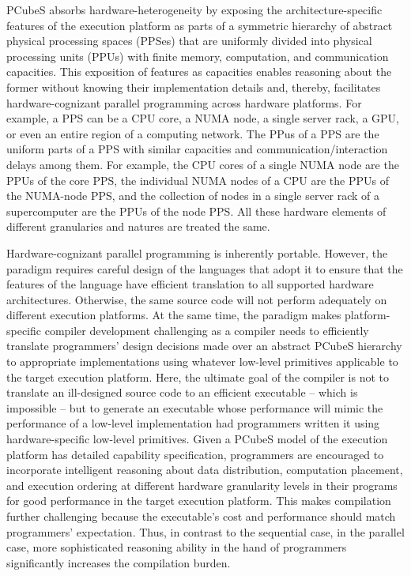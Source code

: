 \documentclass[ASNA,twocolumn]{USG} %
\begin{document}
{{PCubeS absorbs hardware-heterogeneity by exposing the architecture-specific features of the execution platform as parts of a symmetric hierarchy of abstract physical processing spaces (PPSes) that are uniformly divided into physical processing units (PPUs) with finite memory, computation, and communication capacities. This exposition of features as capacities enables reasoning about the former without knowing their implementation details and, thereby, facilitates hardware-cognizant parallel programming across hardware platforms. For example, a PPS can be a CPU core, a NUMA node, a single server rack, a GPU, or even an entire region of a computing network. The PPus of a PPS are the uniform parts of a PPS with similar capacities and communication/interaction delays among them. For example, the CPU cores of a single NUMA node are the PPUs of the core PPS, the individual NUMA nodes of a CPU are the PPUs of the NUMA-node PPS, and the collection of nodes in a single server rack of a supercomputer are the PPUs of the node PPS. All these hardware elements of different granularies and natures are treated the same.

Hardware-cognizant parallel programming is inherently portable. However, the paradigm requires careful design of the languages that adopt it to ensure that the features of the language have efficient translation to all supported hardware architectures. Otherwise, the same source code will not perform adequately on different execution platforms. At the same time, the paradigm makes platform-specific compiler development challenging as a compiler needs to efficiently translate programmers' design decisions made over an abstract PCubeS hierarchy to appropriate implementations using whatever low-level primitives applicable to the target execution platform. Here, the ultimate goal of the compiler is not to translate an ill-designed source code to an efficient executable -- which is impossible -- but to generate an executable whose performance will mimic the performance of a low-level implementation had programmers written it using hardware-specific low-level primitives. Given a PCubeS model of the execution platform has detailed capability specification, programmers are encouraged to incorporate intelligent reasoning about data distribution, computation placement, and execution ordering at different hardware granularity levels in their programs for good performance in the target execution platform. This makes compilation further challenging because the executable's cost and performance should match programmers' expectation. Thus, in contrast to the sequential case, in the parallel case, more sophisticated reasoning ability in the hand of programmers significantly increases the compilation burden. 

}}
\end{document}
